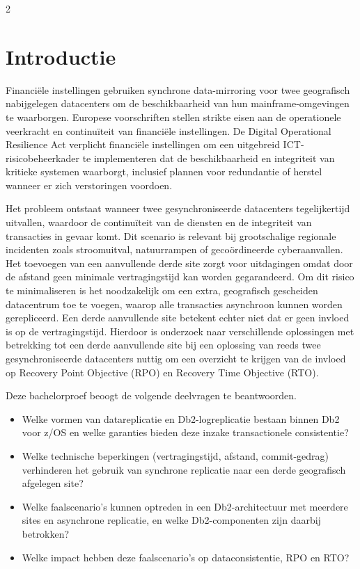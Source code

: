 \documentclass[a0,portrait]{hogent-poster}
\begin{document}
\begin{multicols}{2} %

\section{Introductie}

Financiële instellingen gebruiken synchrone data-mirroring voor twee geografisch nabijgelegen datacenters om de beschikbaarheid van hun mainframe-omgevingen te waarborgen. 
Europese voorschriften stellen strikte eisen aan de operationele veerkracht en continuïteit van financiële instellingen.
De Digital Operational Resilience Act verplicht financiële instellingen om een uitgebreid ICT-risico\-beheer\-kader te implementeren dat de beschikbaarheid en integriteit van kritieke systemen waarborgt, inclusief plannen voor redundantie of herstel wanneer er zich verstoringen voordoen. 

Het probleem ontstaat wanneer twee gesynchroniseerde datacenters tegelijkertijd uitvallen, waardoor de continuïteit van de diensten en de integriteit van transacties in gevaar komt. 
Dit scenario is relevant bij grootschalige regionale incidenten zoals stroomuitval, natuurrampen of gecoördineerde cyberaanvallen.
Het toevoegen van een aanvullende derde site zorgt voor uitdagingen omdat door de afstand geen minimale vertragingstijd kan worden gegarandeerd.
Om dit risico te minimaliseren is het noodzakelijk om een extra, geografisch gescheiden datacentrum toe te voegen, waarop alle transacties asynchroon kunnen worden gerepliceerd.
Een derde aanvullende site betekent echter niet dat er geen invloed is op de vertragingstijd.
Hierdoor is onderzoek naar verschillende oplossingen met betrekking tot een derde aanvullende site bij een oplossing van reeds twee gesynchroniseerde datacenters nuttig om een overzicht te krijgen van de invloed op Recovery Point Objective (RPO) en Recovery Time Objective (RTO).

Deze bachelorproef beoogt de volgende deelvragen te beantwoorden.

\begin{itemize}
    \item Welke vormen van datareplicatie en Db2-logreplicatie bestaan binnen Db2 voor z/OS en welke garanties bieden deze inzake transactionele consistentie?
    \item Welke technische beperkingen (vertragingstijd, afstand, commit-gedrag) verhinderen het gebruik van synchrone replicatie naar een derde geografisch afgelegen site?
    \item Welke faalscenario's kunnen optreden in een Db2-architectuur met meerdere sites en asynchrone replicatie, en welke Db2-componenten zijn daarbij betrokken?
    \item Welke impact hebben deze faalscenario's op dataconsistentie, RPO en RTO\@?
\end{itemize}


\end{multicols}
\end{document}
